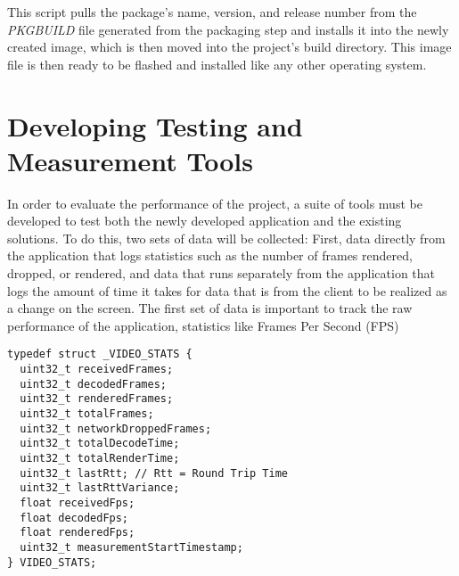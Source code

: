 This script pulls the package's name, version, and release number from the \emph{PKGBUILD} file generated from the packaging step and installs it into the newly created image, which is then moved into the project's build directory.
This image file is then ready to be flashed and installed like any other operating system.


\section{Developing Testing and Measurement Tools}\label{sec:DevelopingTestingAndMeasurementTools}

In order to evaluate the performance of the project, a suite of tools must be developed to test both the newly developed application and the existing solutions.
To do this, two sets of data will be collected: First, data directly from the application that logs statistics such as the number of frames rendered, dropped, or rendered, and data that runs separately from the application that logs the amount of time it takes for data that is from the client to be realized as a change on the screen.
The first set of data is important to track the raw performance of the application, statistics like Frames Per Second (FPS)

\begin{lstlisting}[style=customc,firstnumber=23,title=Excerpt from \emph{/src/video/stats.h}]
typedef struct _VIDEO_STATS {
  uint32_t receivedFrames;
  uint32_t decodedFrames;
  uint32_t renderedFrames;
  uint32_t totalFrames;
  uint32_t networkDroppedFrames;
  uint32_t totalDecodeTime;
  uint32_t totalRenderTime;
  uint32_t lastRtt; // Rtt = Round Trip Time
  uint32_t lastRttVariance;
  float receivedFps;
  float decodedFps;
  float renderedFps;
  uint32_t measurementStartTimestamp;
} VIDEO_STATS;
\end{lstlisting}